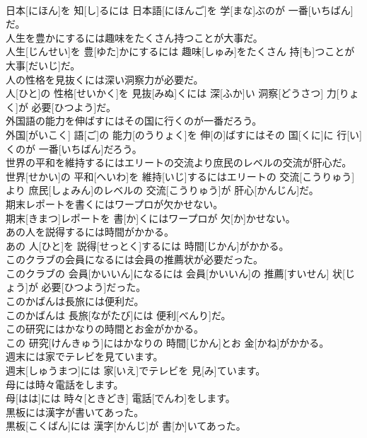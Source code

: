 \documentclass[8pt]{extreport}
\begin{document}
\begin{CJK}{UTF8}{min}
\\	日本[にほん]を 知[し]るには 日本語[にほんご]を 学[まな]ぶのが 一番[いちばん]だ。
\\	人生を豊かにするには趣味をたくさん持つことが大事だ。	
\\	人生[じんせい]を 豊[ゆた]かにするには 趣味[しゅみ]をたくさん 持[も]つことが 大事[だいじ]だ。
\\	人の性格を見抜くには深い洞察力が必要だ。	
\\	人[ひと]の 性格[せいかく]を 見抜[みぬ]くには 深[ふか]い 洞察[どうさつ] 力[りょく]が 必要[ひつよう]だ。
\\	外国語の能力を伸ばすにはその国に行くのが一番だろう。	
\\	外国[がいこく] 語[ご]の 能力[のうりょく]を 伸[の]ばすにはその 国[くに]に 行[い]くのが 一番[いちばん]だろう。
\\	世界の平和を維持するにはエリートの交流より庶民のレベルの交流が肝心だ。	
\\	世界[せかい]の 平和[へいわ]を 維持[いじ]するにはエリートの 交流[こうりゅう]より 庶民[しょみん]のレベルの 交流[こうりゅう]が 肝心[かんじん]だ。
\\	期末レポートを書くにはワープロが欠かせない。	
\\	期末[きまつ]レポートを 書[か]くにはワープロが 欠[か]かせない。
\\	あの人を説得するには時間がかかる。	
\\	あの 人[ひと]を 説得[せっとく]するには 時間[じかん]がかかる。
\\	このクラブの会員になるには会員の推薦状が必要だった。	
\\	このクラブの 会員[かいいん]になるには 会員[かいいん]の 推薦[すいせん] 状[じょう]が 必要[ひつよう]だった。
\\	このかばんは長旅には便利だ。	
\\	このかばんは 長旅[ながたび]には 便利[べんり]だ。
\\	この研究にはかなりの時間とお金がかかる。	
\\	この 研究[けんきゅう]にはかなりの 時間[じかん]とお 金[かね]がかかる。
\\	週末には家でテレビを見ています。	
\\	週末[しゅうまつ]には 家[いえ]でテレビを 見[み]ています。
\\	母には時々電話をします。	
\\	母[はは]には 時々[ときどき] 電話[でんわ]をします。
\\	黒板には漢字が書いてあった。	
\\	黒板[こくばん]には 漢字[かんじ]が 書[か]いてあった。

\end{CJK}
\end{document}
